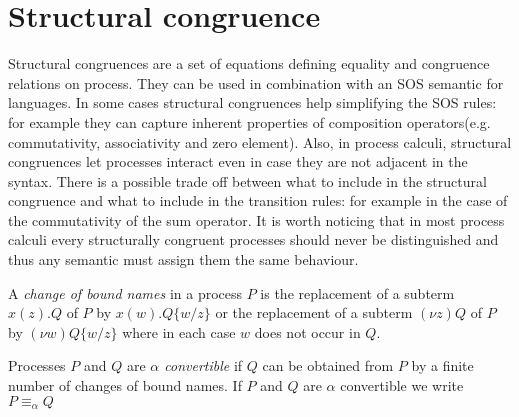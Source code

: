 \section{Structural congruence}

Structural congruences are a set of equations defining equality and congruence relations on process. They can be used in combination with an SOS semantic for languages. In some cases structural congruences help simplifying the SOS rules: for example they can capture inherent properties of composition operators(e.g. commutativity, associativity and zero element). Also, in process calculi, structural congruences let processes interact even in case they are not adjacent in the syntax. There is a possible trade off between what to include in the structural congruence and what to include in the transition rules: for example in the case of the commutativity of the sum operator. It is worth noticing that in most process calculi every structurally congruent processes should never be distinguished and thus any semantic must assign them the same behaviour.

\begin{definition}
  A \emph{change of bound names} in a process $P$ is the replacement of a subterm $x(z).Q$ of $P$ by $x(w).Q\{w/z\}$ or the replacement of a subterm $(\nu z)Q$ of $P$ by $(\nu w)Q\{w/z\}$ where in each case $w$ does not occur in $Q$.
\end{definition}

\begin{definition}
  Processes $P$ and $Q$ are \emph{$\alpha$ convertible} if $Q$ can be obtained from $P$ by a finite number of changes of bound names. If $P$ and $Q$ are $\alpha$ convertible we write $P\equiv_{\alpha}Q$
\end{definition}

